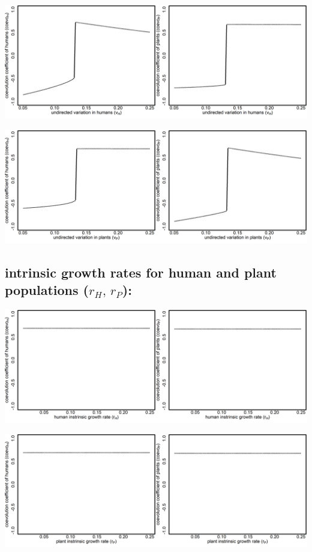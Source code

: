 \documentclass[
]{book}
\begin{document}
\includegraphics[width=1\linewidth]{plots/2_exp_undirected_variation_humans_bifurcationPlotPair}

\includegraphics[width=1\linewidth]{plots/2_exp_undirected_variation_plants_bifurcationPlotPair}

\hypertarget{intrinsic-growth-rates-for-human-and-plant-populations-r_hr_p}{%
\subsection{\texorpdfstring{intrinsic growth rates for human and plant populations (\(r_{H},\,r_{P}\)):}{intrinsic growth rates for human and plant populations (r\_\{H\},\textbackslash,r\_\{P\}):}}\label{intrinsic-growth-rates-for-human-and-plant-populations-r_hr_p}}

\includegraphics[width=1\linewidth]{plots/2_exp_intrinsic_growth_rate_humans_bifurcationPlotPair}

\includegraphics[width=1\linewidth]{plots/2_exp_intrinsic_growth_rate_plants_bifurcationPlotPair}
\end{document}
